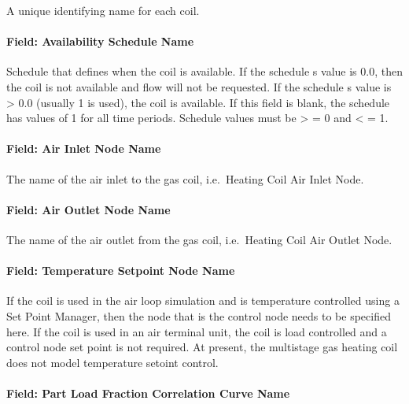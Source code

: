 A unique identifying name for each coil.

\paragraph{Field: Availability Schedule Name}\label{field-availability-schedule-name-5-001}

Schedule that defines when the coil is available. If the schedule s value is 0.0, then the coil is not available and flow will not be requested. If the schedule s value is \textgreater{} 0.0 (usually 1 is used), the coil is available. If this field is blank, the schedule has values of 1 for all time periods. Schedule values must be \textgreater{} = 0 and \textless{} = 1.

\paragraph{Field: Air Inlet Node Name}\label{field-air-inlet-node-name-7}

The name of the air inlet to the gas coil, i.e.~Heating Coil Air Inlet Node.

\paragraph{Field: Air Outlet Node Name}\label{field-air-outlet-node-name-7-000}

The name of the air outlet from the gas coil, i.e.~Heating Coil Air Outlet Node.

\paragraph{Field: Temperature Setpoint Node Name}\label{field-temperature-setpoint-node-name-5}

If the coil is used in the air loop simulation and is temperature controlled using a Set Point Manager, then the node that is the control node needs to be specified here. If the coil is used in an air terminal unit, the coil is load controlled and a control node set point is not required. At present, the multistage gas heating coil does not model temperature setoint control.

\paragraph{Field: Part Load Fraction Correlation Curve Name}\label{field-part-load-fraction-correlation-curve-name-1}

